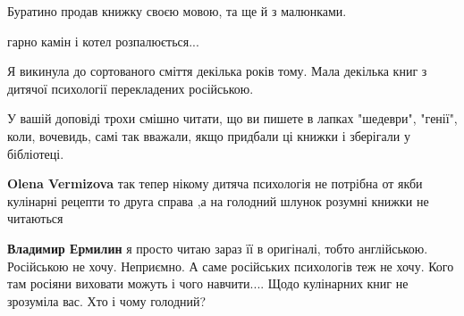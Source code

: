 \begin{itemize}
\begin{itemize}
Буратино продав книжку своєю мовою, та ще й з малюнками.

\end{itemize}

 
гарно камін і котел розпалюється...

 

Я викинула до сортованого сміття декілька років тому. Мала декілька книг з
дитячої психології перекладених російською.

У вашій доповіді трохи смішно читати, що ви пишете в лапках "шедеври", "генії",
коли, вочевидь, самі так вважали, якщо придбали ці книжки і зберігали у
бібліотеці.

\begin{itemize}
 
\textbf{Olena Vermizova} так тепер нікому дитяча психологія не потрібна от якби кулінарні рецепти то друга справа ,а на голодний шлунок розумні книжки не читаються

\begin{itemize}
 
\textbf{Владимир Ермилин} я просто читаю зараз її в оригіналі, тобто англійською. Російською не хочу. Неприємно. А саме російських психологів теж не хочу. Кого там росіяни виховати можуть і чого навчити....
Щодо кулінарних книг не зрозуміла вас. Хто і чому голодний?
\end{itemize}

 

\end{itemize}
\end{itemize}
